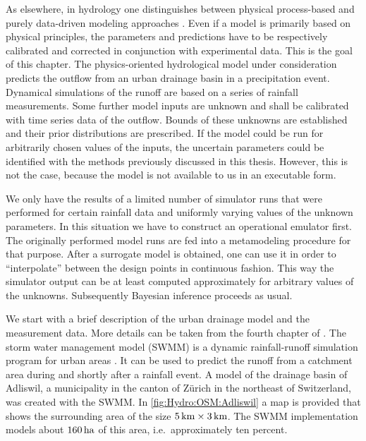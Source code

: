 As elsewhere, in hydrology one distinguishes between physical process-based and purely data-driven modeling approaches \cite{Physics:Singh2002,Physics:Todini2007,Physics:Todini2011}.
Even if a model is primarily based on physical principles, the parameters and predictions have to be respectively calibrated and corrected in conjunction with experimental data.
This is the goal of this chapter.
The physics-oriented hydrological model under consideration predicts the outflow from an urban drainage basin in a precipitation event.
Dynamical simulations of the runoff are based on a series of rainfall measurements.
Some further model inputs are unknown and shall be calibrated with time series data of the outflow.
Bounds of these unknowns are established and their prior distributions are prescribed.
If the model could be run for arbitrarily chosen values of the inputs, the uncertain parameters could be identified with the methods previously discussed in this thesis.
However, this is not the case, because the model is not available to us in an executable form.
\par %
We only have the results of a limited number of simulator runs that were performed for certain rainfall data and uniformly varying values of the unknown parameters.
In this situation we have to construct an operational emulator first.
The originally performed model runs are fed into a metamodeling procedure for that purpose.
After a surrogate model is obtained, one can use it in order to ``interpolate'' between the design points in continuous fashion.
This way the simulator output can be at least computed approximately for arbitrary values of the unknowns.
Subsequently Bayesian inference proceeds as usual.
\par %
We start with a brief description of the urban drainage model and the measurement data.
More details can be taken from the fourth chapter of \cite{Hydro:Machac2015:PhD}.
The storm water management model (SWMM) is a dynamic rainfall-runoff simulation program for urban areas \cite{Hydro:SWMM2015}.
It can be used to predict the runoff from a catchment area during and shortly after a rainfall event.
A model of the drainage basin of Adliswil, a municipality in the canton of Z\"{u}rich in the northeast of Switzerland, was created with the SWMM.
In \cref{fig:Hydro:OSM:Adliswil} a map is provided that shows the surrounding area of the size \(\unit[5]{km} \times \unit[3]{km}\).
The SWMM implementation models about \(\unit[160]{ha}\) of this area, i.e.\ approximately ten percent.
